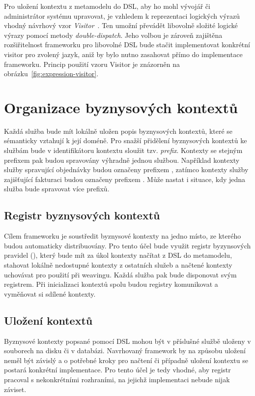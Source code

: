 Pro uložení kontextu z metamodelu do \gls{DSL}, aby ho mohl vývojář či administrátor
systému upravovat, je vzhledem k reprezentaci logických výrazů vhodný návrhový vzor
\textit{Visitor}~\cite{fowler2002patterns}. Ten umožní převádět libovolně složité logické
výrazy pomocí metody \textit{double-dispatch}. Jeho volbou je zároveň zajištěna rozšiřitelnost
frameworku pro libovolné \gls{DSL} \textendash\xspace bude stačit implementovat konkrétní
visitor pro zvolený jazyk, aniž by bylo nutno zasahovat přímo do implementace frameworku.
Princip použití vzoru Visitor je znázorněn na obrázku~\ref{fig:expression-visitor}.

\section{Organizace byznysových kontextů}

Každá služba bude mít lokálně uložen popis byznysových kontextů, které se sémanticky vztahují
k její doméně. Pro snažší přidělení byznysových kontextů ke službám bude v identifikátoru kontextu sloužit
tzv. \textit{prefix}. Kontexty se stejným prefixem pak budou spravovány výhradně jednou službou. Například kontexty
služby spravující objednávky budou označeny prefixem , zatímco kontexty služby zajišťující fakturaci budou
označeny prefixem . Může nastat i situace, kdy jedna služba bude spravovat více prefixů.

\subsection{Registr byznysových kontextů}

Cílem frameworku je soustředit byznysové kontexty na jedno místo, ze kterého budou
automaticky distribuovány. Pro tento účel bude využit registr byzynsových pravidel
(), který bude mít za úkol kontexty načítat z \gls{DSL} do metamodelu,
stahovat lokálně nedostupné kontexty z ostatních služeb a načtené kontexty uchovávat pro použití při weavingu.
Každá služba pak bude disponovat svým registrem. Při inicializaci kontextů spolu budou registry komunikovat
a vyměňovat si sdílené kontexty.

\subsection{Uložení kontextů}

Byznysové kontexty popsané pomocí \gls{DSL} mohou být v příslušné službě uloženy v souborech na disku či v
databázi. Navrhovaný framework by na způsobu uložení neměl být závislý a o potřebné kroky
pro načtení či případně uložení kontextu se postará konkrétní implementace. Pro tento účel
je tedy vhodné, aby registr pracoval s nekonkrétními rozhraními, na jejichž implementaci
nebude nijak záviset.

